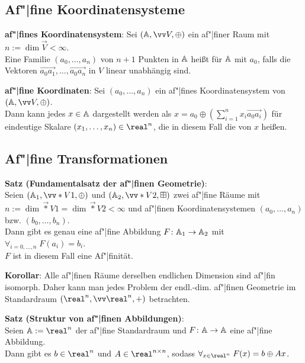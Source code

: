 \pagebreak

\subsection{%
    Af"|fine Koordinatensysteme%
}

\textbf{af"|fines Koordinatensystem}:
Sei $(\AA, \vec{V}, \oplus)$ ein af"|finer Raum mit $n := \dim \vec{V} < \infty$.\\
Eine Familie $(a_0, \dotsc, a_n)$ von $n+1$ Punkten in $\AA$ heißt
 für $\AA$ mit  $a_0$, falls die
Vektoren $\vec{a_0a_1}, \dotsc, \vec{a_0a_n}$ in $V$ linear unabhängig sind.

\textbf{af"|fine Koordinaten}:
Sei $(a_0, \dotsc, a_n)$ ein af"|fines Koordinatensystem von $(\AA, \vec{V}, \oplus)$.\\
Dann kann jedes $x \in \AA$ dargestellt werden als
$x = a_0 \oplus (\sum_{i=1}^n x_i \vec{a_0a_i})$
für eindeutige Skalare $(x_1, \dotsc, x_n) \in \real^n$, die in diesem Fall die
 von $x$ heißen.

\subsection{%
    Af"|fine Transformationen%
}

\textbf{Satz (Fundamentalsatz der af"|finen Geometrie)}:\\
Seien $(\AA_1, \vec*{V}{1}, \oplus)$ und $(\AA_2, \vec*{V}{2}, \boxplus)$ zwei af"|fine Räume
mit $n := \dim \vec*{V}{1} = \dim \vec*{V}{2} < \infty$
und af"|finen Koordinatensystemen $(a_0, \dotsc, a_n)$ bzw. $(b_0, \dotsc, b_n)$.\\
Dann gibt es genau eine af"|fine Abbildung $F\colon \AA_1 \to \AA_2$ mit
$\forall_{i=0,\dotsc,n}\; F(a_i) = b_i$.\\
$F$ ist in diesem Fall eine Af"|finität.

\textbf{Korollar}:
Alle af"|finen Räume derselben endlichen Dimension sind af"|fin isomorph.
Daher kann man jedes Problem der endl.-dim. af"|finen Geometrie im Standardraum
$(\real^n, \vec{\real}^n, +)$ betrachten.

\linie

\textbf{Satz (Struktur von af"|finen Abbildungen)}:\\
Seien $\AA := \real^n$ der af"|fine Standardraum und
$F\colon \AA \to \AA$ eine af"|fine Abbildung.\\
Dann gibt es $b \in \real^n$ und $A \in \real^{n \times n}$, sodass
$\forall_{x \in \real^n}\; F(x) = b \oplus Ax$.

